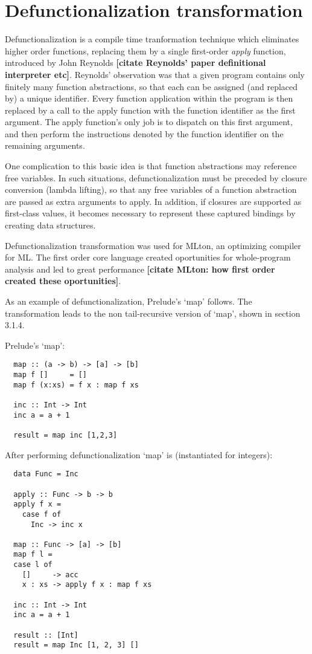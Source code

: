 \documentclass[diploma]{softlab-thesis}
\begin{document}
\section {Defunctionalization transformation}

Defunctionalization is a compile time tranformation technique which eliminates higher order 
functions, replacing them by a single first-order \textit{apply} function, introduced by John Reynolds \textbf{[citate
Reynolds' paper definitional interpreter etc]}.
Reynolds' observation was that a given program contains only finitely many function abstractions, so that each can 
be assigned (and replaced by) a unique identifier. Every function application within the program is then replaced 
by a call to the apply function with the function identifier as the first argument. The apply function's only job is 
to dispatch on this first argument, and then perform the instructions denoted by the function identifier on the 
remaining arguments.

One complication to this basic idea is that function abstractions may reference free variables. In such situations, 
defunctionalization must be preceded by closure conversion (lambda lifting), so that any free variables of a function 
abstraction are passed as extra arguments to apply. In addition, if closures are supported as first-class values, 
it becomes necessary to represent these captured bindings by creating data structures.

Defunctionalization transformation was used for MLton, an optimizing compiler for ML. The first order 
core language created oportunities for whole-program analysis and led to great performance \textbf{[citate MLton: how 
first order created these oportunities]}.

As an example of defunctionalization, Prelude's `map' follows. The transformation leads to 
the non tail-recursive version of `map', shown in section 3.1.4.

Prelude's `map':

\begin{verbatim}
  map :: (a -> b) -> [a] -> [b]
  map f []     = []
  map f (x:xs) = f x : map f xs

  inc :: Int -> Int 
  inc a = a + 1
  
  result = map inc [1,2,3]
\end{verbatim}

After performing defunctionalization `map' is (instantiated for integers):
\begin{verbatim}
  data Func = Inc 

  apply :: Func -> b -> b
  apply f x =
    case f of
      Inc -> inc x

  map :: Func -> [a] -> [b]
  map f l =
  case l of
    []     -> acc
    x : xs -> apply f x : map f xs

  inc :: Int -> Int 
  inc a = a + 1

  result :: [Int]
  result = map Inc [1, 2, 3] []
\end{verbatim}
\end{document}
